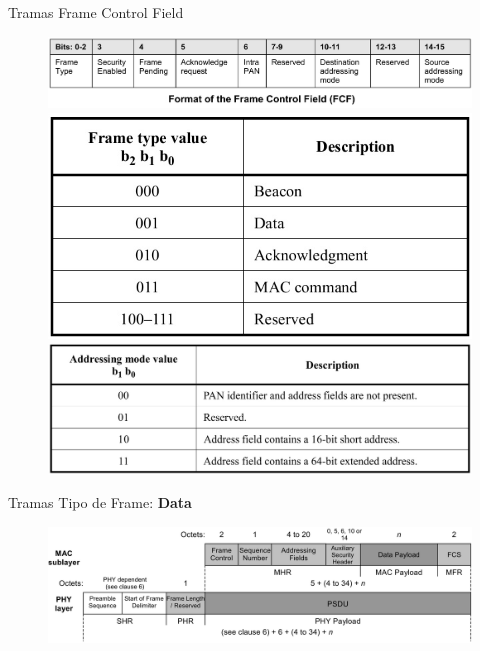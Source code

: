\documentclass[aspectratio=169,handout]{beamer}
\begin{document}
\begin{frame}[t]{Tramas}
Frame Control Field
	\begin{figure}[H]
	\centering
		\includegraphics[height=.3\textheight]{./imagenes/FCF.jpg}\\
		\vspace{20px}
		\hspace{-10px}
		\includegraphics[height=.37\textheight]{./imagenes/frametype.jpg}
		\includegraphics[height=.37\textheight]{./imagenes/addressingmode.jpg}
	\end{figure} 	
\end{frame}

\begin{frame}[t]{Tramas}
Tipo de Frame: \textbf{Data}
\vspace{10px}
	\begin{figure}[H]
		\includegraphics[width=1\textwidth]{./imagenes/data.jpg}
	\end{figure}	  	  	
\end{frame}
\end{document}
